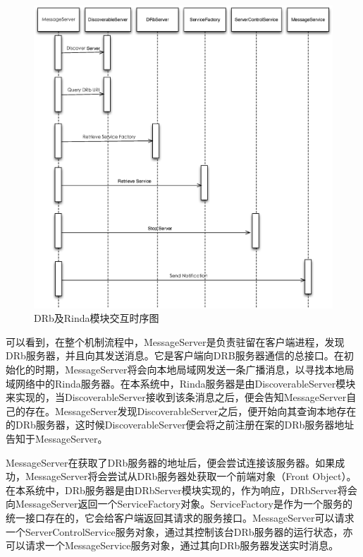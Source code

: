 \begin{figure}[h]
\centering
\includegraphics[width=\textwidth]{images/overview/drb_rinda_timing.eps}
\caption{DRb及Rinda模块交互时序图}
\label{fig-drb-rinda-timing}
\end{figure}

可以看到，在整个机制流程中，MessageServer是负责驻留在客户端进程，发现DRb服务器，并且向其发送消息。它是客户端向DRB服务器通信的总接口。在初始化的时期，MessageServer将会向本地局域网发送一条广播消息，以寻找本地局域网络中的Rinda服务器。在本系统中，Rinda服务器是由DiscoverableServer模块来实现的，当DiscoverableServer接收到该条消息之后，便会告知MessageServer自己的存在。MessageServer发现DiscoverableServer之后，便开始向其查询本地存在的DRb服务器，这时候DiscoverableServer便会将之前注册在案的DRb服务器地址告知于MessageServer。

MessageServer在获取了DRb服务器的地址后，便会尝试连接该服务器。如果成功，MessageServer将会尝试从DRb服务器处获取一个前端对象（Front Object）。在本系统中，DRb服务器是由DRbServer模块实现的，作为响应，DRbServer将会向MessageServer返回一个ServiceFactory对象。ServiceFactory是作为一个服务的统一接口存在的，它会给客户端返回其请求的服务接口。MessageServer可以请求一个ServerControlService服务对象，通过其控制该台DRb服务器的运行状态，亦可以请求一个MessageService服务对象，通过其向DRb服务器发送实时消息。

